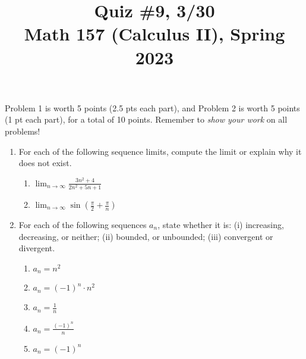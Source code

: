 \documentclass[11pt]{article}
\title{Quiz \#9, 3/30\\ Math 157 (Calculus II), Spring 2023}
\date{}
\begin{document}
\maketitle

\thispagestyle{empty}

\vspace{-2cm}

Problem 1 is worth 5 points (2.5 pts each part), and Problem 2 is worth 5 points (1 pt each part), for a total of 10 points. Remember to \emph{show your work} on all problems!

\begin{enumerate}

\item For each of the following sequence limits, compute the limit or explain why it does not exist.

\begin{enumerate}
\item $\displaystyle \lim_{n\to \infty} \frac{3n^2+4}{2n^2+5n+1}$
\item $\displaystyle \lim_{n\to \infty} \sin\left(\frac{\pi}{2}+\frac{\pi}{n}\right)$
\end{enumerate}

\vspace{2.5in}

\item For each of the following sequences $a_n$, state whether it is: (i) increasing, decreasing, or neither; (ii) bounded, or unbounded; (iii) convergent or divergent.

\begin{enumerate}
\item $a_n = n^2$
\item $a_n = (-1)^n \cdot n^2$
\item $a_n = \frac{1}{n}$
\item $a_n = \frac{(-1)^n}{n}$
\item $a_n = (-1)^n$
\end{enumerate}

\end{enumerate}
\end{document}
